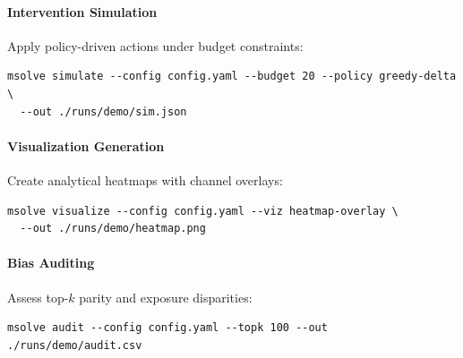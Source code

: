 \documentclass[12pt]{article}
\theoremstyle{plain}
\begin{document}
\paragraph{Intervention Simulation} Apply policy-driven actions under budget constraints:
\begin{verbatim}
msolve simulate --config config.yaml --budget 20 --policy greedy-delta \
  --out ./runs/demo/sim.json
\end{verbatim}

\paragraph{Visualization Generation} Create analytical heatmaps with channel overlays:
\begin{verbatim}
msolve visualize --config config.yaml --viz heatmap-overlay \
  --out ./runs/demo/heatmap.png
\end{verbatim}

\paragraph{Bias Auditing} Assess top-$k$ parity and exposure disparities:
\begin{verbatim}
msolve audit --config config.yaml --topk 100 --out ./runs/demo/audit.csv
\end{verbatim}
\end{document}
